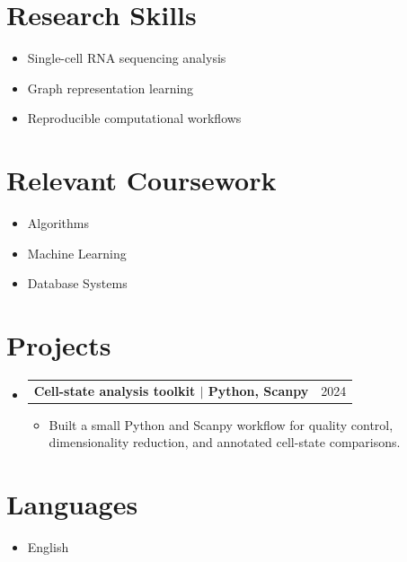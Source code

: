 \documentclass[letterpaper,11pt]{article}
\makeatletter
\newcommand{\resumeItem}[1]{
  \item\small{
    {#1 \vspace{-2pt}}
  }
}
\newcommand{\resumeProjectHeading}[2]{
  \item
    \begin{tabular*}{0.97\textwidth}[t]{l@{\extracolsep{\fill}}r}
      \small#1 & #2 \\
    \end{tabular*}\vspace{-7pt}
}
\newcommand{\resumeSubHeadingListStart}{\begin{itemize}[leftmargin=0.15in, label={}]}
\newcommand{\resumeSubHeadingListEnd}{\end{itemize}}
\newcommand{\resumeItemListStart}{\begin{itemize}}
\newcommand{\resumeItemListEnd}{\end{itemize}\vspace{-5pt}}
\makeatother
\begin{document}
\section{Research Skills}
\resumeSubHeadingListStart
\resumeItem{Single-cell RNA sequencing analysis}
\resumeItem{Graph representation learning}
\resumeItem{Reproducible computational workflows}
\resumeSubHeadingListEnd

\section{Relevant Coursework}
\resumeSubHeadingListStart
\resumeItem{Algorithms}
\resumeItem{Machine Learning}
\resumeItem{Database Systems}
\resumeSubHeadingListEnd

\section{Projects}
\resumeSubHeadingListStart
\resumeProjectHeading{\textbf{Cell-state analysis toolkit $|$ Python, Scanpy}}{2024}
\resumeItemListStart
\resumeItem{Built a small Python and Scanpy workflow for quality control, dimensionality reduction, and annotated cell-state comparisons.}
\resumeItemListEnd
\resumeSubHeadingListEnd

\section{Languages}
\resumeSubHeadingListStart
\resumeItem{English}
\resumeSubHeadingListEnd
\end{document}
